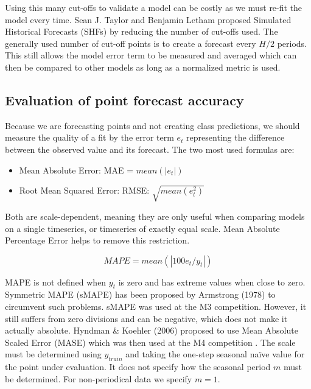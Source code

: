 Using this many cut-offs to validate a model can be costly as we must re-fit the model every time. Sean J. Taylor and Benjamin Letham proposed Simulated Historical Forecasts (SHFs) \cite{prophet} by reducing the number of cut-offs used. The generally used number of cut-off points is to create a forecast every \(H/2\) periods. This still allows the model error term to be measured and averaged which can then be compared to other models as long as a normalized metric is used.


\subsection{Evaluation of point forecast accuracy}

Because we are forecasting points and not creating class predictions, we should measure the quality of a fit by the error term \(e_{t}\) representing the difference between the observed value and its forecast. The two most used formulas are:

\begin{itemize}
    \item Mean Absolute Error: MAE = \(mean(|e_t|)\)
    \item Root Mean Squared Error: RMSE: \(\sqrt{mean(e_t^2)}\)
\end{itemize}

Both are scale-dependent, meaning they are only useful when comparing models on a single timeseries, or timeseries of exactly equal scale. Mean Absolute Percentage Error helps to remove this restriction.

\begin{equation}
    MAPE = mean(|100e_t/y_t|)
\end{equation}

MAPE is not defined when \(y_t\) is zero and has extreme values when close to zero. Symmetric MAPE (sMAPE) has been proposed by Armstrong (1978) \cite{armstrong1985crystal} to circumvent such problems. sMAPE was used at the M3 competition. However, it still suffers from zero divisions and can be negative, which does not make it actually absolute. Hyndman \& Koehler (2006) \cite{HYNDMAN2006679} proposed to use Mean Absolute Scaled Error (MASE) which was then used at the M4 competition \cite{M4}. The scale must be determined using \(y_{train}\) and taking the one-step seasonal na\"ive value for the point under evaluation. It does not specify how the seasonal period \(m\) must be determined. For non-periodical data we specify \(m=1\).

